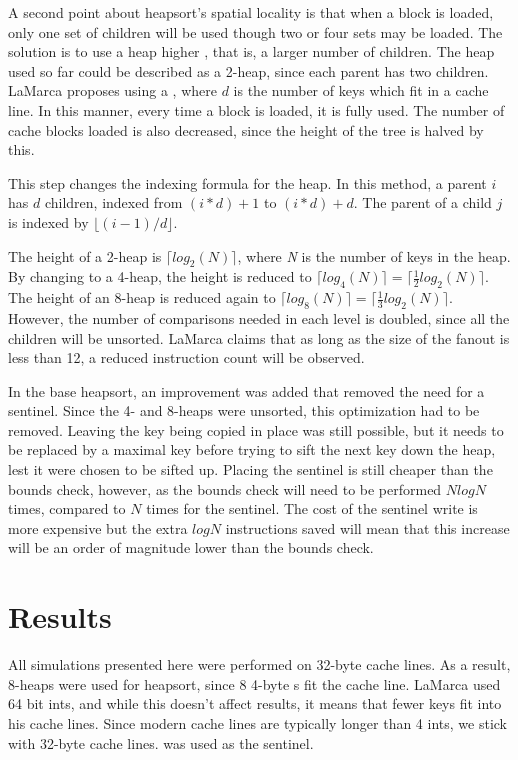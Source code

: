 A second point about heapsort's spatial locality is that when a block is loaded,
only one set of children will be used though two or four sets may be loaded. The
solution is to use a heap higher , that is, a larger number of
children. The heap used so far could be described as a 2-heap, since each
parent has two children. LaMarca proposes using a , where $d$ is the
number of keys which fit in a cache line. In this manner, every time a block is
loaded, it is fully used. The number of cache blocks loaded is also decreased,
since the height of the tree is halved by this.

This step changes the indexing formula for the heap. In this method, a parent
$i$ has $d$ children, indexed from $(i*d) + 1$ to $(i*d) + d$. The parent of a
child $j$ is indexed by $\lfloor{}(i-1)/d\rfloor{}$.

The height of a 2-heap is $\lceil{}log_2(N)\rceil{}$, where \textit{N} is the
number of keys in the heap. By changing to a 4-heap, the height is reduced to
$\lceil{}log_4(N)\rceil{} = \lceil{}\tfrac{1}{2}log_2(N)\rceil{}$. The height of
an 8-heap is reduced again to $\lceil{}log_8(N)\rceil{} =
\lceil{}\tfrac{1}{3}log_2(N)\rceil{}$. However, the number of comparisons needed
in each level is doubled, since all the children will be unsorted. LaMarca
claims that as long as the size of the fanout is less than 12, a reduced
instruction count will be observed.

In the base heapsort, an improvement was added that removed the need for a
sentinel. Since the 4- and 8-heaps were unsorted, this optimization had to be
removed. Leaving the key being copied in place was still possible, but it needs
to be replaced by a maximal key before trying to sift the next key down the
heap, lest it were chosen to be sifted up. Placing the sentinel is still cheaper
than the bounds check, however, as the bounds check will need to be performed
$NlogN$ times, compared to $N$ times for the sentinel. The cost of the sentinel
write is more expensive but the extra $logN$ instructions saved will mean that
this increase will be an order of magnitude lower than the bounds check.

\section{Results}
All simulations presented here were performed on 32-byte cache lines. As a
result, 8-heaps were used for heapsort, since 8 4-byte s fit the cache
line. LaMarca used 64 bit ints, and while this doesn't affect results, it means
that fewer keys fit into his cache lines. Since modern cache lines are typically
longer than 4 ints, we stick with 32-byte cache lines.  was used
as the sentinel.

